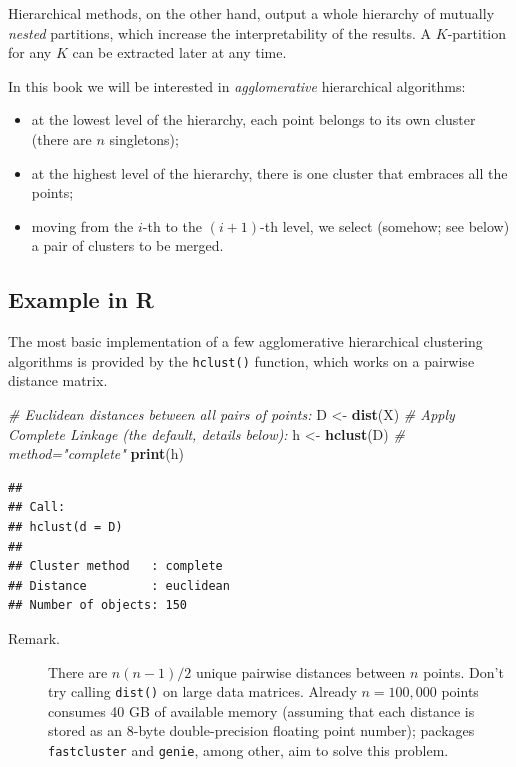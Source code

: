 \documentclass[10pt,b5paper,krantz1]{krantz}
\newenvironment{Shaded}{\begin{snugshade}}{\end{snugshade}}
\newcommand{\CommentTok}[1]{\textcolor[rgb]{0.37,0.37,0.37}{\textit{#1}}}
\newcommand{\KeywordTok}[1]{\textcolor[rgb]{0.27,0.27,0.27}{\textbf{#1}}}
\newcommand{\NormalTok}[1]{#1}
\newcommand{\StringTok}[1]{\textcolor[rgb]{0.5,0.5,0.5}{#1}}
\begin{document}
Hierarchical methods, on the other hand, output a whole hierarchy
of mutually \emph{nested} partitions, which increase the interpretability
of the results.
A \(K\)-partition for any \(K\) can be extracted later at any time.

In this book we will be interested in \emph{agglomerative} hierarchical algorithms:

\begin{itemize}
\item
  at the lowest level of the hierarchy, each point belongs to its own
  cluster (there are \(n\) singletons);
\item
  at the highest level of the hierarchy,
  there is one cluster that embraces all the points;
\item
  moving from the \(i\)-th to the \((i+1)\)-th level,
  we select (somehow; see below) a pair of clusters to be merged.
\end{itemize}

\hypertarget{example-in-r-6}{%
\subsection{Example in R}\label{example-in-r-6}}

The most basic implementation of a few
agglomerative hierarchical clustering algorithms
is provided by the \texttt{hclust()} function, which works on a pairwise
distance matrix.

\begin{Shaded}
\begin{Highlighting}[]
\CommentTok{# Euclidean distances between all pairs of points:}
\NormalTok{D <-}\StringTok{ }\KeywordTok{dist}\NormalTok{(X)}
\CommentTok{# Apply Complete Linkage (the default, details below):}
\NormalTok{h <-}\StringTok{ }\KeywordTok{hclust}\NormalTok{(D) }\CommentTok{# method="complete"}
\KeywordTok{print}\NormalTok{(h)}
\end{Highlighting}
\end{Shaded}

\begin{verbatim}
## 
## Call:
## hclust(d = D)
## 
## Cluster method   : complete 
## Distance         : euclidean 
## Number of objects: 150
\end{verbatim}

\begin{description}
\item[Remark.]
There are \(n(n-1)/2\) unique pairwise distances between \(n\) points.
Don't try calling \texttt{dist()} on large data matrices.
Already \(n=100{,}000\) points consumes 40 GB of available memory
(assuming that each distance is stored as an 8-byte double-precision floating
point number); packages \texttt{fastcluster} and \texttt{genie}, among other,
aim to solve this problem.
\end{description}
\end{document}
